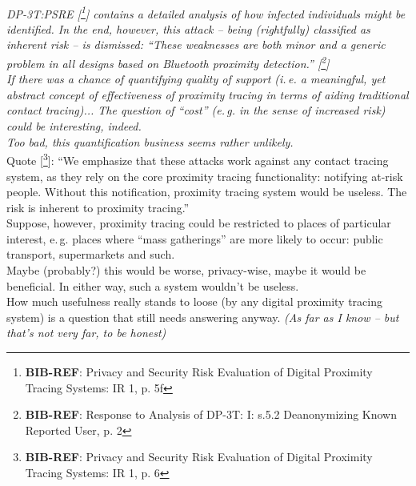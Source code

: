 \documentclass{article}
\newcommand*{\TODO}[2][todoC]{{\color{#1} #2}}
\newcommand*{\TODOsty}[2][styC]{\TODO[#1]{#2}}
\newcommand*{\NOTE}[2][noteC]{\TODO[#1]{\textit{#2}}}
\newcommand*{\TODOfn}[2][noteC]{\TODO[#1]{[\footnote{\TODO[#1]{#2}}]}}
\newcommand*{\TODOref}[2][todoC]{\TODOfn[#1]{\textbf{BIB-REF}: #2}}
\begin{document}
  \NOTE{\smallskip\\%
    DP-3T:PSRE\TODOref[noteC]{%
      Privacy and Security Risk Evaluation of Digital Proximity Tracing Systems:
      IR 1, p. 5f}
    contains a detailed analysis of how infected individuals might be identified.
    In the end, however, this attack --
    being (rightfully) classified as inherent risk -- is dismissed:
    ``These weaknesses are both minor and a generic problem in all
    designs based on Bluetooth proximity detection.''\TODOref[noteC]{%
      Response to Analysis of DP-3T:
      I: s.5.2 Deanonymizing Known Reported User, p. 2}\medskip\\
    If there was a chance of quantifying quality of support
    (i.\,e. a meaningful, yet abstract concept of effectiveness
    of proximity tracing in terms of aiding traditional contact tracing)...
    The question of ``cost'' (e.\,g. in the sense of increased risk)
    could be interesting, indeed.\\
    Too bad, this quantification business seems rather unlikely.}
  \pagebreak\\
  Quote \TODOref{%
    Privacy and Security Risk Evaluation of Digital Proximity Tracing Systems:
    IR 1, p. 6}:
  ``We emphasize that these attacks work against any contact tracing system,
  as they rely on the core proximity tracing functionality:
  notifying at-risk people.
  Without this notification, proximity tracing system would be useless.
  The risk is inherent to proximity tracing.''\medskip\\
  Suppose, however, proximity tracing could be restricted to places
  of particular interest, e.\,g. places where ``mass gatherings'' are
  more likely to occur:
  public transport, supermarkets and such.\\
  \TODOsty{Maybe (probably?) this would be worse, privacy-wise,
    maybe it would be beneficial.}
  In either way, such a system wouldn't be useless.\\
  How much usefulness really stands to loose
  (by any digital proximity tracing system) is a question
  that still needs answering anyway.
  \NOTE{(As far as I know -- but that's not very far, to be honest)}
\end{document}
